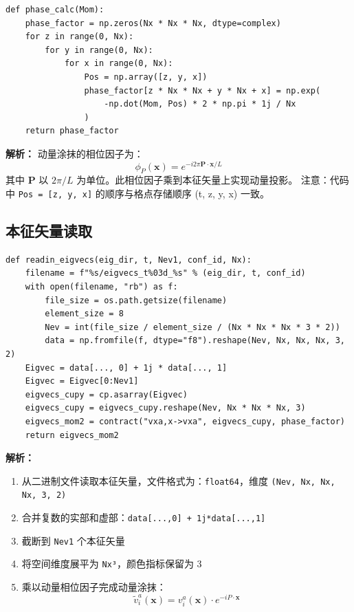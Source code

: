 \documentclass[12pt,a4paper]{ctexart}
\begin{document}
\begin{lstlisting}[caption={动量相位因子计算}]
def phase_calc(Mom):
    phase_factor = np.zeros(Nx * Nx * Nx, dtype=complex)
    for z in range(0, Nx):
        for y in range(0, Nx):
            for x in range(0, Nx):
                Pos = np.array([z, y, x])
                phase_factor[z * Nx * Nx + y * Nx + x] = np.exp(
                    -np.dot(Mom, Pos) * 2 * np.pi * 1j / Nx
                )
    return phase_factor
\end{lstlisting}

\textbf{解析：}
动量涂抹的相位因子为：
\begin{equation}
\phi_P(\mathbf{x}) = e^{-i 2\pi \mathbf{P}\cdot\mathbf{x} / L}
\end{equation}
其中 $\mathbf{P}$ 以 $2\pi/L$ 为单位。此相位因子乘到本征矢量上实现动量投影。
注意：代码中 \texttt{Pos = [z, y, x]} 的顺序与格点存储顺序 (t, z, y, x) 一致。

\subsection{本征矢量读取}

\begin{lstlisting}[caption={读取本征矢量}]
def readin_eigvecs(eig_dir, t, Nev1, conf_id, Nx):
    filename = f"%s/eigvecs_t%03d_%s" % (eig_dir, t, conf_id)
    with open(filename, "rb") as f:
        file_size = os.path.getsize(filename)
        element_size = 8
        Nev = int(file_size / element_size / (Nx * Nx * Nx * 3 * 2))
        data = np.fromfile(f, dtype="f8").reshape(Nev, Nx, Nx, Nx, 3, 2)
    Eigvec = data[..., 0] + 1j * data[..., 1]
    Eigvec = Eigvec[0:Nev1]
    eigvecs_cupy = cp.asarray(Eigvec)
    eigvecs_cupy = eigvecs_cupy.reshape(Nev, Nx * Nx * Nx, 3)
    eigvecs_mom2 = contract("vxa,x->vxa", eigvecs_cupy, phase_factor)
    return eigvecs_mom2
\end{lstlisting}

\textbf{解析：}
\begin{enumerate}
    \item 从二进制文件读取本征矢量，文件格式为：\texttt{float64}，维度 \texttt{(Nev, Nx, Nx, Nx, 3, 2)}
    \item 合并复数的实部和虚部：\texttt{data[...,0] + 1j*data[...,1]}
    \item 截断到 \texttt{Nev1} 个本征矢量
    \item 将空间维度展平为 \texttt{Nx³}，颜色指标保留为 3
    \item 乘以动量相位因子完成动量涂抹：
    \begin{equation}
        \tilde{v}_i^a(\mathbf{x}) = v_i^a(\mathbf{x}) \cdot e^{-iP\cdot\mathbf{x}}
    \end{equation}
\end{enumerate}
\end{document}
